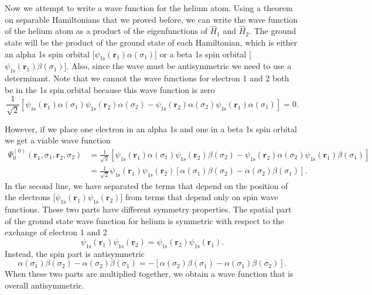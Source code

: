 \documentclass[../Main/chem331-notes.tex]{subfiles}
\begin{document}
Now we attempt to write a wave function for the helium atom.
Using a theorem on separable Hamiltonians that we proved before, we can write the wave function of the helium atom as a product of the eigenfunctions of $\hat{H}_1$ and $\hat{H}_2$.
The ground state will be the product of the ground state of each Hamiltonian, which is either an alpha 1s spin orbital [$\psi_\mathrm{1s}(\mathbf{r}_1) \alpha(\sigma_1)$] or a beta 1s spin orbital [$\psi_\mathrm{1s}(\mathbf{r}_1) \beta(\sigma_1)$].
Also, since the wave must be antisymmetric we need to use a determinant.
Note that we cannot the wave functions for electron 1 and 2 both be in the 1s spin orbital because this wave function is zero
\begin{equation}
\frac{1}{\sqrt{2}} \left[
\psi_\mathrm{1s}(\mathbf{r}_1) \alpha(\sigma_1)
\psi_\mathrm{1s}(\mathbf{r}_2) \alpha(\sigma_2)
-
\psi_\mathrm{1s}(\mathbf{r}_2) \alpha(\sigma_2)
\psi_\mathrm{1s}(\mathbf{r}_1) \alpha(\sigma_1)
\right] = 0.
\end{equation}

However, if we place one electron in an alpha 1s and one in a beta 1s spin orbital we get a viable wave function
\begin{equation}
\begin{split}
\Psi_0^{(0)} (\mathbf{r}_1,\sigma_1,\mathbf{r}_2,\sigma_2) 
& =
\frac{1}{\sqrt{2}} \left[
\psi_\mathrm{1s}(\mathbf{r}_1) \alpha(\sigma_1)
\psi_\mathrm{1s}(\mathbf{r}_2) \beta(\sigma_2)
-
\psi_\mathrm{1s}(\mathbf{r}_2) \alpha(\sigma_2)
\psi_\mathrm{1s}(\mathbf{r}_1) \beta(\sigma_1)
\right] \\
& = 
\frac{1}{\sqrt{2}} 
\psi_\mathrm{1s}(\mathbf{r}_1)
\psi_\mathrm{1s}(\mathbf{r}_2)
\left[
\alpha(\sigma_1)
\beta(\sigma_2)
-
\alpha(\sigma_2)
\beta(\sigma_1)
\right].
\end{split}
\end{equation}
In the second line, we have separated the terms that depend on the position of the electrons [$\psi_\mathrm{1s}(\mathbf{r}_1)
\psi_\mathrm{1s}(\mathbf{r}_2)$] from terms that depend only on spin wave functions.
These two parts have different symmetry properties.
The spatial part of the ground state wave function for helium is symmetric with respect to the exchange of electron 1 and 2
\begin{equation}
\psi_\mathrm{1s}(\mathbf{r}_1)
\psi_\mathrm{1s}(\mathbf{r}_2)
=\psi_\mathrm{1s}(\mathbf{r}_2)
\psi_\mathrm{1s}(\mathbf{r}_1).
\end{equation}
Instead, the spin part is antisymmetric
\begin{equation}
\alpha(\sigma_1)
\beta(\sigma_2)
-
\alpha(\sigma_2)
\beta(\sigma_1)
=
- \left[
\alpha(\sigma_2)
\beta(\sigma_1)
-
\alpha(\sigma_1)
\beta(\sigma_2)
\right].
\end{equation}
When these two parts are multiplied together, we obtain a wave function that is overall antisymmetric.
\end{document}
